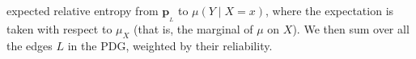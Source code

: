 \documentclass{article}
\theoremstyle{plain}
\theoremstyle{definition}
\theoremstyle{remark}
\newcommand\mat[1]{\mathbf{#1}}
\newcommand{\bp}[1][L]{\mat{p}_{\!_{#1}\!}}
\newcommand{\V}{\mathcal V}
\newcommand{\N}{\mathcal N}
\newcommand{\Ed}{\mathcal E}
\newcommand{\dg}[1]{\mathfrak{#1}}
\numberwithin{equation}{section}
\begin{document}
                expected 
			relative entropy from $\bp$ to $\mu(Y\mid X=x)$,
where the expectation is taken with respect to $\mu_X$ (that is, the
marginal of $\mu$ on $X$). 
We then sum over all the edges $L$ in the PDG,
weighted by their reliability.
        
\end{document}
